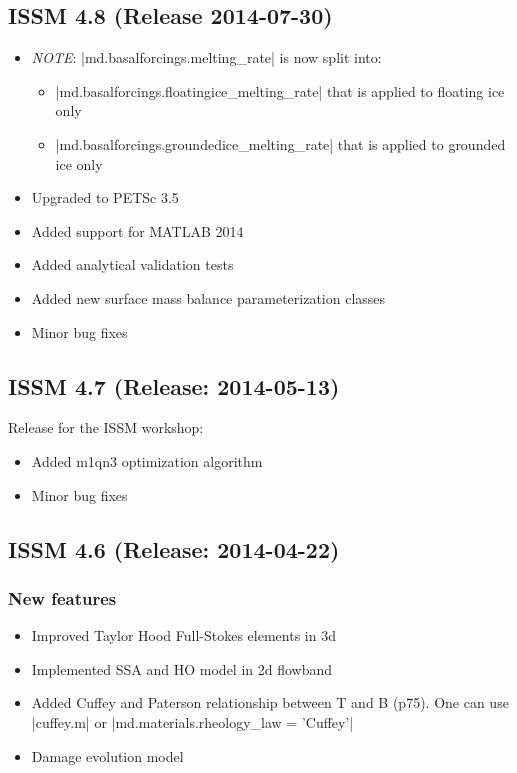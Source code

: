 \subsection*{ISSM 4.8 (Release 2014-07-30)}
\begin{itemize}
\item \emph{NOTE}: \lstinlinebg|md.basalforcings.melting_rate| is now split into:
\begin{itemize}
\item \lstinlinebg|md.basalforcings.floatingice_melting_rate| that is applied to floating ice only
\item \lstinlinebg|md.basalforcings.groundedice_melting_rate| that is applied to grounded ice only
\end{itemize}
\item Upgraded to PETSc 3.5
\item Added support for MATLAB 2014
\item Added analytical validation tests
\item Added new surface mass balance parameterization classes
\item Minor bug fixes
\end{itemize}

\subsection*{ISSM 4.7 (Release: 2014-05-13)}
Release for the ISSM workshop:
\begin{itemize}
\item Added m1qn3 optimization algorithm
\item Minor bug fixes
\end{itemize}

\subsection*{ISSM 4.6 (Release: 2014-04-22)}
\subsubsection{New features}
\begin{itemize}
\item Improved Taylor Hood Full-Stokes elements in 3d
\item Implemented SSA and HO model in 2d flowband
\item Added Cuffey and Paterson relationship between T and B (p75). One can use \lstinlinebg|cuffey.m| or \lstinlinebg|md.materials.rheology_law = 'Cuffey'|
\item Damage evolution model
\end{itemize}
